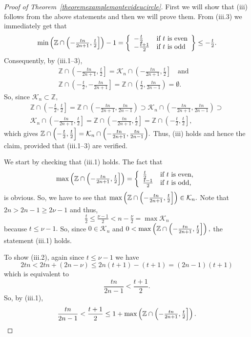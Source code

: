 \documentclass[a4paper, 11pt]{amsart}
\numberwithin{equation}{section}
\theoremstyle{customnumberedtheorem}
\theoremstyle{definitionwithbfnote}
\newcommand{\Z}{\ensuremath{\mathbb{Z}}}
\newcommand{\andq}[1][and]{\ensuremath{\quad\text{#1}\quad}}
\begin{document}
\begin{proof}[Proof of Theorem~\ref{theoremexamplemontevideucircle}]
First we will show that (iii) follows from the above statements and
then we will prove them. From (iii.3) we immediately get that
\[
  \min \left( \Z \cap \Bigl(-\tfrac{tn}{2n+1},\tfrac{t}{2}\Bigr]\right) - 1 =
 \left\{\begin{array}{ll}
  -\tfrac{t}{2} & \text{if $t$ is even}\\
  -\tfrac{t+1}{2} & \text{if $t$ is odd}
 \end{array}\right\} \le -\tfrac{t}{2}.
\]
Consequently, by (iii.1--3),
\begin{multline*}
 \Z \cap \left(-\frac{tn}{2n+1},\frac{t}{2}\right] = \mathcal{K}_n \cap \left(-\frac{tn}{2n+1},\frac{t}{2}\right]
 \andq \\
 \Z \cap \left(-\frac{t}{2}, -\frac{tn}{2n+1}\right] = \Z \cap \left(\frac{t}{2},\frac{tn}{2n-1}\right) = \emptyset.
\end{multline*}
So, since $\mathcal{K}_n \subset \Z,$
\begin{multline*}
 \Z \cap \left(-\frac{t}{2},\frac{t}{2}\right] =
 \Z \cap \left(-\frac{tn}{2n+1},\frac{tn}{2n-1}\right) \supset
 \mathcal{K}_n \cap \left(-\frac{tn}{2n+1},\frac{tn}{2n-1}\right) \supset \\
    \mathcal{K}_n \cap \left(-\frac{tn}{2n+1},\frac{t}{2}\right] =
    \Z \cap \left(-\frac{tn}{2n+1},\frac{t}{2}\right] =
    \Z \cap \left(-\frac{t}{2},\frac{t}{2}\right],
\end{multline*}
which gives
$\Z \cap \Bigl(-\tfrac{t}{2},\tfrac{t}{2}\Bigr] = \mathcal{K}_n \cap \Bigl(-\tfrac{tn}{2n+1},\tfrac{tn}{2n-1}\Bigr).$
Thus, (iii) holds and hence the claim, provided that (iii.1--3) are verified.

We start by checking that (iii.1) holds.
The fact that
\[
 \max \left( \Z \cap \Bigl(-\tfrac{tn}{2n+1},\tfrac{t}{2}\Bigr]\right) =
 \left\{\begin{array}{ll}
  \tfrac{t}{2} & \text{if $t$ is even,}\\
  \tfrac{t-1}{2} & \text{if $t$ is odd,}
 \end{array}\right.
\]
is obvious.
So, we have to see that
$\max \left( \Z \cap \Bigl(-\tfrac{tn}{2n+1},\tfrac{t}{2}\Bigr]\right) \in \mathcal{K}_n.$
Note that $2n > 2n - 1 \ge 2\nu - 1$ and thus,
\[
 \tfrac{t}{2} \le \tfrac{\nu - 1}{2} < n-\tfrac{\nu}{2} = \max \mathcal{K}_n
\]
because $t \le \nu -1.$
So, since $0 \in \mathcal{K}_n$ and
$0 <  \max \left( \Z \cap \Bigl(-\tfrac{tn}{2n+1},\tfrac{t}{2}\Bigr]\right),$
the statement (iii.1) holds.

To show (iii.2), again since $t \le \nu -1$ we have
\[
 2tn < 2tn + (2n - \nu) \le 2n(t+1) - (t+1) = (2n-1)(t+1)
\]
which is equivalent to
\[
 \frac{tn}{2n-1} < \frac{t+1}{2}.
\]
So, by (iii.1),
\[
 \frac{tn}{2n-1} < \frac{t+1}{2} \le 1 + \max \left( \Z \cap \Bigl(-\tfrac{tn}{2n+1},\tfrac{t}{2}\Bigr]\right).
\]


\end{proof}
\end{document}
